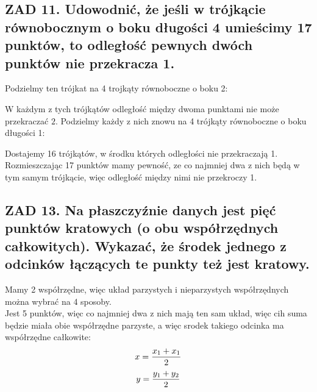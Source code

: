 \documentclass{article}
\begin{document}
\subsection*{ZAD 11. Udowodnić, że jeśli w trójkącie równobocznym o boku długości 4 umieścimy 17 punktów, to odległość pewnych dwóch punktów nie przekracza 1.}
  Podzielmy ten trójkat na 4 trojkąty równoboczne o boku 2:
  \begin{center}
  \end{center}
  W każdym z tych trójkątów odległość między dwoma punktami nie może przekraczać $2$. Podzielmy każdy z nich znowu na 4 trójkąty równoboczne o boku długości 1:
  \begin{center}
  \end{center}
  Dostajemy 16 trójkątów, w środku których odległości nie przekraczają 1. Rozmieszczając 17 punktów mamy pewność, ze co najmniej dwa z nich będą w tym samym trójkącie, więc odległość między nimi nie przekroczy 1.
\newpage
\subsection*{ZAD 13. Na płaszczyźnie danych jest pięć punktów kratowych (o obu współrzędnych całkowitych). Wykazać, że środek jednego z odcinków łączących te punkty też jest kratowy.}
Mamy 2 współrzędne, więc układ parzystych i nieparzystych współrzędnych można wybrać na 4 sposoby.\\
Jest 5 punktów, więc co najmniej dwa z nich mają ten sam układ, więc cih suma będzie miała obie współrzędne parzyste, a więc srodek takiego odcinka ma współrzędne całkowite:
$$x={x_1+x_1\over2}$$
$$y = {y_1+y_2\over2}$$
\newpage
\end{document}
